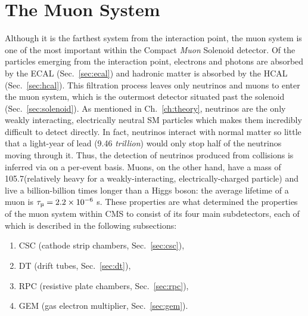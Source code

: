 \section{The Muon System}
\label{sec:muon_sys}
Although it is the farthest system from the interaction point, the muon system is one of the most important within the Compact \emph{Muon} Solenoid detector.
Of the particles emerging from the interaction point, electrons and photons are absorbed by the ECAL (Sec.~\ref{sec:ecal}) and hadronic matter is absorbed by the HCAL (Sec.~\ref{sec:hcal}).
This filtration process leaves only neutrinos and muons to enter the muon system, which is the outermost detector situated past the solenoid (Sec.~\ref{sec:solenoid}).
As mentioned in Ch.~\ref{ch:theory}, neutrinos are the only weakly interacting, electrically neutral SM particles which makes them incredibly difficult to detect directly.
In fact, neutrinos interact with normal matter so little that a light-year of lead (9.46 \emph{trillion}\Km) would only stop half of the neutrinos moving through it.
Thus, the detection of neutrinos produced from \pp collisions is inferred via \MET on a per-event basis.
Muons, on the other hand, have a mass of 105.7\MeV (relatively heavy for a weakly-interacting, electrically-charged particle) and live a billion-billion times longer than a Higgs boson: the average lifetime of a muon is $\tau_{\Pmu} = 2.2 \times \tentotheminus{6}$ s.
These properties are what determined the properties of the muon system within CMS to consist of its four main subdetectors, each of which is described in the following subsections:
\begin{enumerate}
    \item CSC (cathode strip chambers, Sec.~\ref{sec:csc}),
    \item DT (drift tubes, Sec.~\ref{sec:dt}),
    \item RPC (resistive plate chambers, Sec.~\ref{sec:rpc}),
    \item GEM (gas electron multiplier, Sec.~\ref{sec:gem}).
\end{enumerate}

